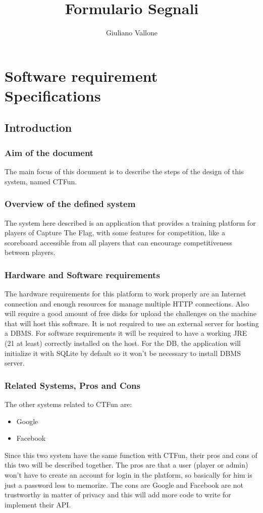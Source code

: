 \documentclass[12pt]{article}
\begin{document}
\title{Formulario Segnali}
\author{Giuliano Vallone}
\date{}
\maketitle

\tableofcontents
\newpage

\section{Software requirement Specifications}
\subsection{Introduction}
\subsubsection{Aim of the document}
The main focus of this document is to describe the steps of the design of this system, named CTFun. 
\subsubsection{Overview of the defined system}
The system here described is an application that provides a training platform for players of Capture The Flag, with some features for competition, like a scoreboard accessible from all players that can encourage competitiveness between players. 
\subsubsection{Hardware and Software requirements}
The hardware requirements for this platform to work properly are an Internet connection and enough resources for manage multiple HTTP connections. Also will require a good amount of free disks for upload the challenges on the machine that will host this software. It is not required to use an external server for hosting a DBMS.
For software requirements it will be required to have a working JRE (21 at least) correctly installed on the host. For the DB, the application will initialize it with SQLite by default so it won't be necessary to install DBMS server.
\subsubsection{Related Systems, Pros and Cons}
The other systems related to CTFun are:
\begin{itemize}
\item Google
\item Facebook
\end{itemize}
Since this two system have the same function with CTFun, their pros and cons of this two will be described together. The pros are that a user (player or admin) won't have to create an account for login in the platform, so basically for him is just a password less to memorize. The cons are Google and Facebook are not trustworthy in matter of privacy and this will add more code to write for implement their API.
\end{document}
